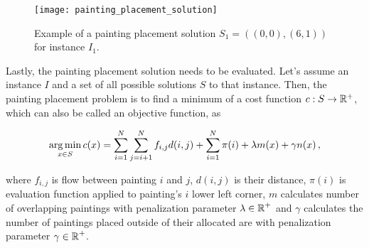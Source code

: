 \begin{figure}
    \texttt{[image: painting\_placement\_solution]}
    \caption[Example of a painting placement solution]{Example of a painting placement solution $S_1 = ((0,0), (6,1))$ for instance $I_1$.}
    \label{fig:painting-placement-solution}
\end{figure}

\newpage

Lastly, the painting placement solution needs to be evaluated.
Let's assume an instance $I$ and a set of all possible solutions $S$ to that instance.
Then, the painting placement problem is to find a minimum of a cost function $c: S \to \operatorname*{\mathbb{R}^+}$,
which can also be called an objective function, as


\begin{equation}
    \operatorname*{arg\,min}_{x \in S} c(x) = \sum\limits_{i=1}^N\sum\limits_{j=i+1}^N f_{i,j}d(i, j) + \sum\limits_{i=1}^N \pi(i) + \lambda m(x) + \gamma n(x) \,,
    \label{eq:objective}
\end{equation}

where $f_{i,j}$ is flow between painting $i$ and $j$, $d(i,j)$ is their distance,
$\pi(i)$ is evaluation function applied to painting's $i$ lower left corner,
$m$ calculates number of overlapping paintings with penalization parameter $\lambda \in \operatorname*{\mathbb{R}}^+$
and $\gamma$ calculates the number of paintings placed outside of their allocated are
with penalization parameter $\gamma \in \operatorname*{\mathbb{R}}^+$.